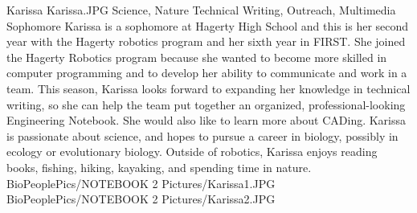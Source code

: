 \insertbio
{Karissa}
{Karissa.JPG}
{Science, Nature}
{Technical Writing, Outreach, Multimedia}
{Sophomore}
{
Karissa is a sophomore at Hagerty High School and this is her second year with the Hagerty robotics program and her sixth year in FIRST. She joined the Hagerty Robotics program because she wanted to become more skilled in computer programming and to develop her ability to communicate and work in a team. This season, Karissa looks forward to expanding her knowledge in technical writing, so she can help the team put together an organized, professional-looking Engineering Notebook. She would also like to learn more about CADing. Karissa is passionate about science, and hopes to pursue a career in biology, possibly in ecology or evolutionary biology. Outside of robotics, Karissa enjoys reading books, fishing, hiking, kayaking, and spending time in nature.
}
{BioPeoplePics/NOTEBOOK 2 Pictures/Karissa1.JPG}
{BioPeoplePics/NOTEBOOK 2 Pictures/Karissa2.JPG}

